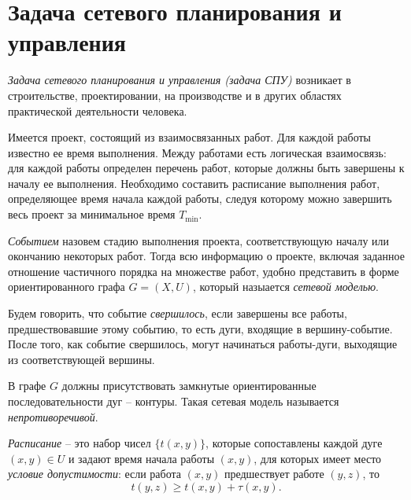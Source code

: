 \section{Задача сетевого планирования и управления}

\begin{definition}
  \emph{Задача сетевого планирования и управления (задача СПУ)} возникает в строительстве, проектировании, на производстве и в других областях практической деятельности человека.

  Имеется проект, состоящий из взаимосвязанных работ. Для каждой работы известно ее время выполнения. Между работами есть логическая взаимосвязь: для каждой работы определен перечень работ, которые должны быть завершены к началу ее выполнения. Необходимо составить расписание выполнения работ, определяющее время начала каждой работы, следуя которому можно завершить весь проект за минимальное время $T_{\min} $.
\end{definition}

\begin{definition}
  \emph{Событием} назовем стадию выполнения проекта, соответствующую началу или окончанию некоторых работ. Тогда всю информацию о проекте, включая заданное отношение частичного порядка на множестве работ, удобно представить в форме ориентированного графа $G = (X,U)$, который назыается \emph{сетевой моделью}.
\end{definition}

\begin{definition}
  Будем говорить, что событие \emph{свершилось}, если завершены все работы, предшествовавшие этому событию, то есть дуги, входящие в вершину-событие. После того, как событие свершилось, могут начинаться работы-дуги, выходящие из соответствующей вершины.
\end{definition}

\begin{definition}
  В графе $G$ должны присутствовать замкнутые ориентированные последовательности дуг -- контуры. Такая сетевая модель называется \emph{непротиворечивой}.
\end{definition}

\begin{definition}
  \emph{Расписание} -- это набор чисел $\big\{t(x,y)\big\}$, которые сопоставлены каждой дуге $(x,y) \in U$ и задают время начала работы $(x,y)$, для которых имеет место \emph{условие допустимости}: если работа $(x,y)$ предшествует работе $(y,z)$, то
  \[
    t(y,z) \geqslant t(x,y) + \tau (x,y).
  \]
\end{definition}

